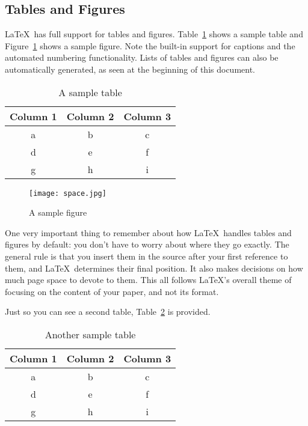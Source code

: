 \documentclass{article}
\begin{document}
\subsection{Tables and Figures}

\LaTeX\ has full support for tables and figures.  Table~\ref{table-sample} shows a sample table and Figure~\ref{figure-sample} shows a sample figure.  Note the built-in support for captions and the automated numbering functionality.  Lists of tables and figures can also be automatically generated, as seen at the beginning of this document.

\begin{table}
\centering
\begin{tabular}{|c|c|c|}\hline
Column 1 & Column 2 & Column 3 \\\hline\hline
a & b & c \\
d & e & f \\
g & h & i \\\hline
\end{tabular}

\caption{A sample table}
\label{table-sample}
\end{table}

\begin{figure}
\centering
\texttt{[image: space.jpg]} 

\caption{A sample figure}
\label{figure-sample}
\end{figure}

One very important thing to remember about how \LaTeX\ handles tables and figures by default: you don't have to worry about where they go exactly.  The general rule is that you insert them in the source after your first reference to them, and \LaTeX\ determines their final position.  It also makes decisions on how much page space to devote to them.  This all follows \LaTeX's overall theme of focusing on the content of your paper, and not its format.

Just so you can see a second table, Table~\ref{table-sample2} is provided.

\begin{table}
\centering
\begin{tabular}{|c|c|c|}\hline
Column 1 & Column 2 & Column 3 \\\hline\hline
a & b & c \\
d & e & f \\
g & h & i \\\hline
\end{tabular}

\caption{Another sample table}
\label{table-sample2}
\end{table}
\end{document}
